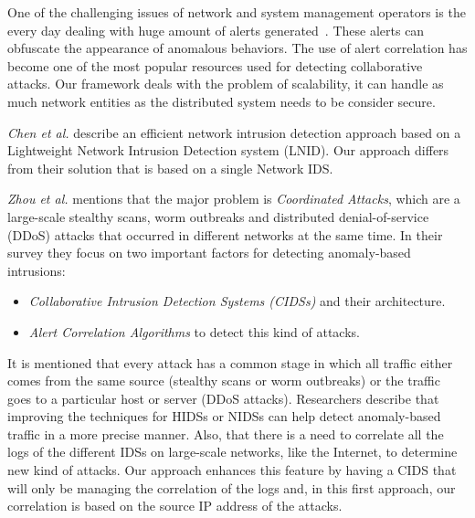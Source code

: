 \documentclass[conference]{IEEEtran}
\begin{document}
One of the challenging issues of network and system management operators is the every day dealing with huge amount of alerts generated~\cite{modelbasedsurveySalahMD13}.  These alerts can obfuscate the appearance of anomalous behaviors. The use of alert correlation has become one of the most popular resources used for detecting collaborative attacks. Our framework deals with the problem of scalability, it can handle as much network entities as the distributed system needs to be consider secure.        
 
\textit{Chen et al.} \cite{chen2010efficientnetworkintrusion} describe an efficient network intrusion detection approach based on a Lightweight Network Intrusion Detection system (LNID). Our approach differs from their solution that is based on a single Network IDS.

\textit{Zhou et al.} \cite{zhou2010survey} mentions that the major problem is \emph{Coordinated Attacks}, which are a large-scale stealthy scans, worm outbreaks and distributed denial-of-service (DDoS) attacks that occurred in different networks at the same time. In their survey they focus on two important factors for detecting anomaly-based intrusions:
\begin{itemize}
\item \textit{Collaborative Intrusion Detection Systems (CIDSs)} and their architecture.
\item \textit{Alert Correlation Algorithms} to detect this kind of attacks.
\end{itemize}

It is mentioned that every attack has a common stage in which all traffic either comes from the same source (stealthy scans or worm outbreaks) or the traffic goes to a particular host or server (DDoS attacks). Researchers describe that improving the techniques for HIDSs or NIDSs can help detect anomaly-based traffic in a more precise manner. Also, that there is a need to correlate all the logs of the different IDSs on large-scale networks, like the Internet, to determine new kind of attacks. Our approach enhances this feature by having a CIDS that will only be managing the correlation of the logs and, in this first approach, our correlation is based on the source IP address of the attacks. 
\end{document}
